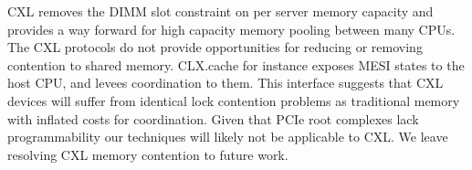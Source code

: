 CXL removes the DIMM slot constraint on per server memory capacity and provides
a way forward for high capacity memory pooling between many CPUs. The CXL
protocols do not provide opportunities for reducing or removing contention to
shared memory.  CLX.cache for instance exposes MESI states to the host CPU, and
levees coordination to them. This interface suggests that CXL devices will
suffer from identical lock contention problems as traditional memory with
inflated costs for coordination. Given that PCIe root complexes lack
programmability our techniques will likely not be applicable to CXL. We leave
resolving CXL memory contention to future work.